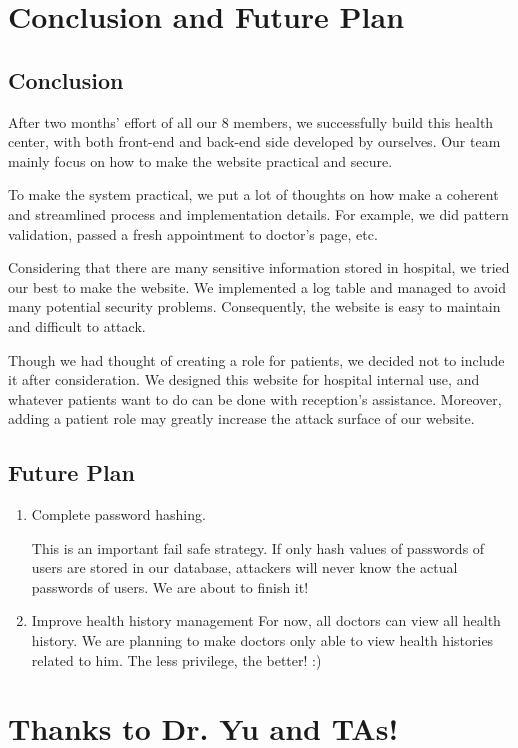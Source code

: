 \section{Conclusion and Future Plan}
\subsection{Conclusion}
After two months’ effort of all our 8 members, we successfully build this health center, with both front-end and back-end side developed by ourselves.  Our team mainly focus on how to make the website practical and secure.

To make the system practical, we put a lot of thoughts on how make a coherent and streamlined process and implementation details. For example, we did pattern validation, passed a fresh appointment to doctor’s page, etc. 

Considering that there are many sensitive information stored in hospital, we tried our best to make the website. We implemented a log table and managed to avoid many potential security problems. Consequently, the website is easy to maintain and difficult to attack.

Though we had thought of creating a role for patients, we decided not to include it after consideration. We designed this website for hospital internal use, and whatever patients want to do can be done with reception’s assistance. Moreover, adding a patient role may greatly increase the attack surface of our website.

\subsection{Future Plan}
\begin{enumerate}
    \item Complete password hashing. 
    
This is an important fail safe strategy. If only hash values of passwords of users are stored in our database, attackers will never know the actual passwords of users. We are about to finish it!
    \item Improve health history management
For now, all doctors can view all health history. We are planning to make doctors only able to view health histories related to him. The less privilege, the better! :)

\end{enumerate}

\newpage 
\section*{Thanks to Dr. Yu and TAs!}